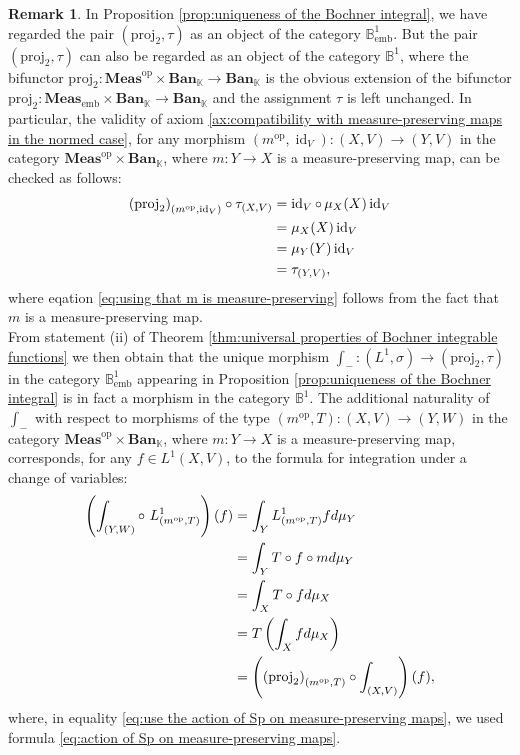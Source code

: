 \documentclass{amsart}
\theoremstyle{definition}
\newtheorem{remark}[definition]{Remark}
\theoremstyle{plain}
\newcommand{\id}{\operatorname{id}}
\newcommand{\opMeas}{\mathbf{Meas}^\mathrm{op}}
\newcommand{\embMeas}{\mathbf{Meas}_\mathrm{emb}}
\newcommand{\Ban}{\mathbf{Ban}_{\mathbb{K}}}
\newcommand{\proj}{\mathrm{proj}_{2}}
\newcommand{\Bemb}{\mathbb{B}_{\mathrm{emb}}^1}
\newcommand{\B}{\mathbb{B}^1}
\begin{document}
        \begin{remark}
            In Proposition \ref{prop:uniqueness of the Bochner integral}, we have regarded the pair $(\proj,\tau)$ as an object of the category $\Bemb$.
            But the pair $(\proj,\tau)$ can also be regarded as an object of the category $\B$, where the bifunctor $\proj \colon \opMeas \times \Ban \rightarrow \Ban$ is the obvious extension of the bifunctor $\proj \colon \embMeas \times \Ban \rightarrow \Ban$ and the assignment $\tau$ is left unchanged.
            In particular, the validity of axiom \ref{ax:compatibility with measure-preserving maps in the normed case}, for any morphism $(m^{\mathrm{op}},\id_V) \colon (X,V) \rightarrow (Y,V)$ in the category $\opMeas \times \Ban$, where $m \colon Y \rightarrow X$ is a measure-preserving map, can be checked as follows:
            \begin{align}
                \left( \proj \right)_{(m^{\mathrm{op}},\id_V)} \circ \tau_{(X,V)} &= \id_V \circ \, \mu_X(X) \id_V \notag \\
                &= \mu_X(X) \id_V \notag \\
                &= \mu_Y(Y) \id_V \label{eq:using that m is measure-preserving} \\
                &= \tau_{(Y,V)} \notag,
            \end{align}
            where eqation \eqref{eq:using that m is measure-preserving} follows from the fact that $m$ is a measure-preserving map. \\
            From statement (ii) of Theorem \ref{thm:universal properties of Bochner integrable functions} we then obtain that the unique morphism $\int_{-} \colon (L^1,\sigma) \rightarrow (\proj,\tau)$ in the category $\Bemb$ appearing in Proposition \ref{prop:uniqueness of the Bochner integral} is in fact a morphism in the category $\B$.
            The additional naturality of $\int_{-}$ with respect to morphisms of the type $\left( m^{\mathrm{op}},T \right) \colon (X,V) \rightarrow (Y,W)$ in the category $\opMeas \times \Ban$, where $m \colon Y \rightarrow X$ is a measure-preserving map, corresponds, for any $f \in L^1(X,V)$, to the formula for integration under a change of variables:
            \begin{align}
                \left( \int_{(Y,W)} \circ ~ L^1_{\left( m^{\mathrm{op}},T \right)} \right) (f) &= \int_Y L^1_{\left( m^{\mathrm{op}},T \right)} f d\mu_Y \notag \\
                &= \int_Y T \circ f \circ m d\mu_Y \label{eq:use the action of Sp on measure-preserving maps} \\
                &= \int_X T \circ f d\mu_X \notag \\
                &= T \left( \int_X f d\mu_X \right) \notag \\
                &= \left( \left( \proj \right)_{\left( m^{\mathrm{op}},T \right)} \circ \int_{(X,V)} \right) (f), \notag
            \end{align} 
            where, in equality \eqref{eq:use the action of Sp on measure-preserving maps}, we used formula \eqref{eq:action of Sp on measure-preserving maps}.
        \end{remark}
\end{document}
